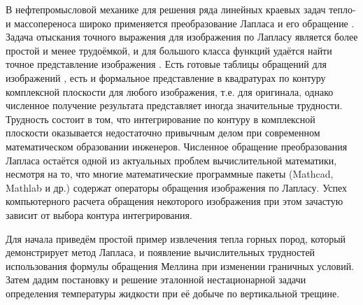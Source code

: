 В нефтепромысловой механике для решения ряда линейных краевых задач тепло- и массопереноса широко применяется преобразование Лапласа и его обращение \cite{alish1,alish2}. Задача отыскания точного выражения для изображения по Лапласу является более простой и менее трудоёмкой, и для большого класса функций удаётся найти точное представление изображения \cite{alish1}. Есть готовые таблицы обращений для изображений \cite{alish3}, есть и формальное представление в квадратурах по контуру  комплексной плоскости для любого изображения, т.е. для оригинала, однако численное получение результата представляет иногда значительные трудности. Трудность состоит в том, что интегрирование по контуру в комплексной плоскости оказывается недостаточно привычным делом при современном математическом образовании инженеров. Численное обращение преобразования Лапласа остаётся одной из актуальных проблем вычислительной математики, несмотря на то, что многие математические программные пакеты (Mathcad, Mathlab и др.) содержат операторы обращения изображения по Лапласу. Успех компьютерного расчета обращения некоторого изображения при этом зачастую зависит от выбора контура интегрирования.

Для начала приведём простой пример извлечения тепла горных пород, который демонстрирует метод Лапласа, и появление вычислительных трудностей использования формулы обращения Меллина при изменении граничных условий. Затем дадим постановку и решение эталонной нестационарной задачи определения температуры жидкости при её добыче по вертикальной трещине. 